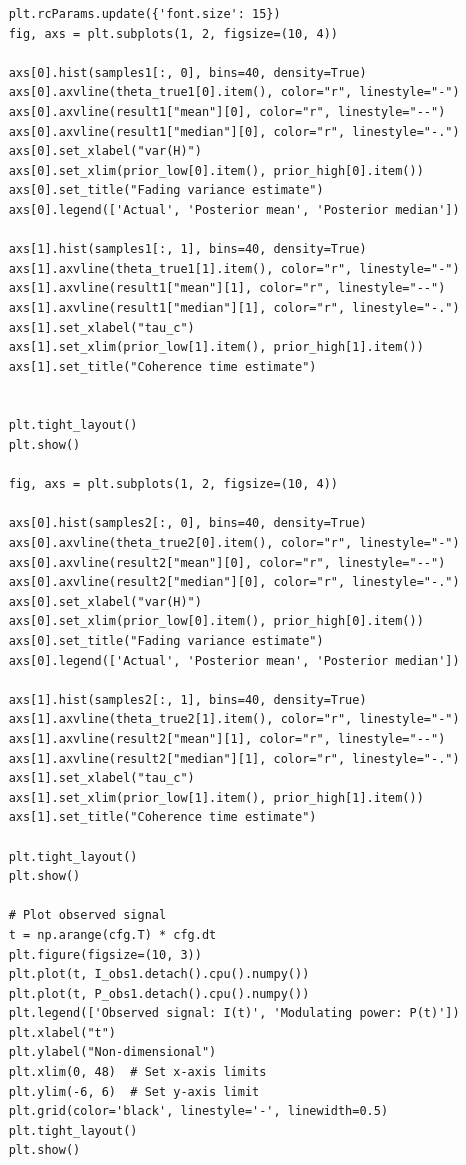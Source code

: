 \documentclass{article}
\begin{document}
\begin{verbatim}
    plt.rcParams.update({'font.size': 15})
    fig, axs = plt.subplots(1, 2, figsize=(10, 4))

    axs[0].hist(samples1[:, 0], bins=40, density=True)
    axs[0].axvline(theta_true1[0].item(), color="r", linestyle="-")
    axs[0].axvline(result1["mean"][0], color="r", linestyle="--")
    axs[0].axvline(result1["median"][0], color="r", linestyle="-.")
    axs[0].set_xlabel("var(H)")
    axs[0].set_xlim(prior_low[0].item(), prior_high[0].item())
    axs[0].set_title("Fading variance estimate")
    axs[0].legend(['Actual', 'Posterior mean', 'Posterior median'])

    axs[1].hist(samples1[:, 1], bins=40, density=True)
    axs[1].axvline(theta_true1[1].item(), color="r", linestyle="-")
    axs[1].axvline(result1["mean"][1], color="r", linestyle="--")
    axs[1].axvline(result1["median"][1], color="r", linestyle="-.")
    axs[1].set_xlabel("tau_c")
    axs[1].set_xlim(prior_low[1].item(), prior_high[1].item())
    axs[1].set_title("Coherence time estimate")
    

    plt.tight_layout()
    plt.show()
    
    fig, axs = plt.subplots(1, 2, figsize=(10, 4))

    axs[0].hist(samples2[:, 0], bins=40, density=True)
    axs[0].axvline(theta_true2[0].item(), color="r", linestyle="-")
    axs[0].axvline(result2["mean"][0], color="r", linestyle="--")
    axs[0].axvline(result2["median"][0], color="r", linestyle="-.")
    axs[0].set_xlabel("var(H)")
    axs[0].set_xlim(prior_low[0].item(), prior_high[0].item())
    axs[0].set_title("Fading variance estimate")
    axs[0].legend(['Actual', 'Posterior mean', 'Posterior median'])

    axs[1].hist(samples2[:, 1], bins=40, density=True)
    axs[1].axvline(theta_true2[1].item(), color="r", linestyle="-")
    axs[1].axvline(result2["mean"][1], color="r", linestyle="--")
    axs[1].axvline(result2["median"][1], color="r", linestyle="-.")    
    axs[1].set_xlabel("tau_c")
    axs[1].set_xlim(prior_low[1].item(), prior_high[1].item())
    axs[1].set_title("Coherence time estimate")

    plt.tight_layout()
    plt.show()

    # Plot observed signal
    t = np.arange(cfg.T) * cfg.dt
    plt.figure(figsize=(10, 3))
    plt.plot(t, I_obs1.detach().cpu().numpy())
    plt.plot(t, P_obs1.detach().cpu().numpy())
    plt.legend(['Observed signal: I(t)', 'Modulating power: P(t)'])
    plt.xlabel("t")
    plt.ylabel("Non-dimensional")
    plt.xlim(0, 48)  # Set x-axis limits
    plt.ylim(-6, 6)  # Set y-axis limit
    plt.grid(color='black', linestyle='-', linewidth=0.5)
    plt.tight_layout()
    plt.show()


\end{verbatim}
\end{document}
